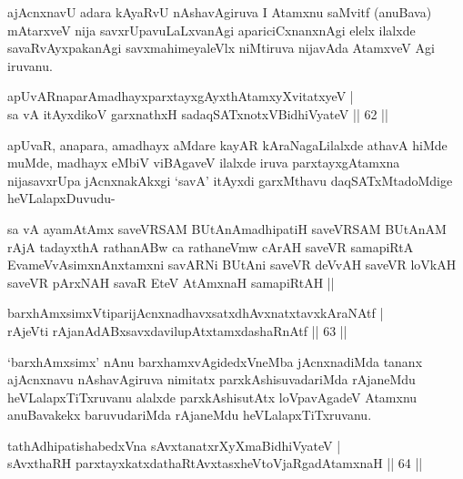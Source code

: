 \begin{artha}
ajAcnxnavU adara kAyaRvU nAshavAgiruva I Atamxnu saMvitf (anuBava) mAtarxveV nija savxrUpavuLaLxvanAgi apariciCxnanxnAgi elelx ilalxde savaRvAyxpakanAgi savxmahimeyaleVlx niMtiruva nijavAda AtamxveV Agi iruvanu.
\end{artha}


\begin{shl}
apUvARnaparAmadhayxparxtayxgAyxthAtamxyXvitatxyeV |\\
sa vA itAyxdikoV garxnathxH sadaqSATxnotxV\s BidhiVyateV \hfill || 62 ||
\end{shl}

\begin{artha}
apUvaR, anapara, amadhayx aMdare kayAR kAraNagaLilalxde athavA hiMde
muMde, madhayx eMbiV viBAgaveV ilalxde iruva parxtayxgAtamxna
nijasavxrUpa jAcnxnakAkxgi `savA' itAyxdi garxMthavu daqSATxMtadoMdige
heVLalapxDuvudu-
\end{artha}

\centerline{}

\begin{shl}
sa vA ayamAtAmx saveVRSAM BUtAnAmadhipatiH saveVRSAM BUtAnAM rAjA tadayxthA rathanABw ca rathaneVmw cArAH saveVR samapiRtA EvameVvAsimxnAnxtamxni savARNi BUtAni saveVR deVvAH saveVR loVkAH saveVR pArxNAH savaR EteV AtAmxnaH samapiRtAH ||
\end{shl}



\begin{shl}
barxhAmxsimxVtiparijAcnxnadhavxsatxdhAvxnatxtavxkAraNAtf |\\
rAjeVti rAjanAdABxsavxdavilupAtxtamxdashaRnAtf \hfill || 63 ||
\end{shl}
\begin{artha}
`barxhAmxsimx' nAnu barxhamxvAgidedxVneMba jAcnxnadiMda tananx   ajAcnxnavu nAshavAgiruva nimitatx parxkAshisuvadariMda rAjaneMdu   heVLalapxTiTxruvanu alalxde parxkAshisutAtx loVpavAgadeV Atamxnu   anuBavakekx baruvudariMda rAjaneMdu heVLalapxTiTxruvanu.
\end{artha}


\begin{shl}
tathA\s dhipatishabedxVna sAvxtanatxrXyXmaBidhiVyateV |\\
sAvxthaRH parxtayxkatxdathaRtAvxtasxheVtoVjaRgadAtamxnaH \hfill || 64 ||
\end{shl}	

